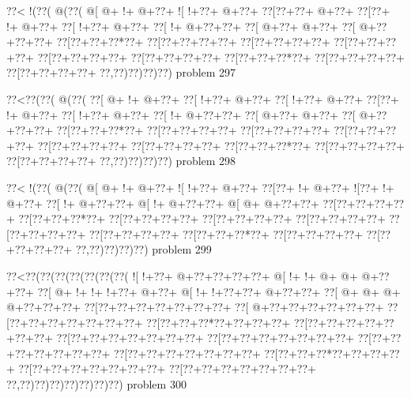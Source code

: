 \vbox{\vbox{\goo
\0??<\- !(\0??(\- @(\0??(
\- @[\- @+\- !+\- @+\0??+
\- ![\- !+\0??+\- @+\0??+
\0??[\0??+\0??+\- @+\0??+
\0??[\0??+\- !+\- @+\0??+
\0??[\- !+\0??+\- @+\0??+
\0??[\- !+\- @+\0??+\0??+
\0??[\- @+\0??+\- @+\0??+
\0??[\- @+\0??+\0??+\0??+
\0??[\0??+\0??+\0??*\0??+
\0??[\0??+\0??+\0??+\0??+
\0??[\0??+\0??+\0??+\0??+
\0??[\0??+\0??+\0??+\0??+
\0??[\0??+\0??+\0??+\0??+
\0??[\0??+\0??+\0??+\0??+
\0??[\0??+\0??+\0??*\0??+
\0??[\0??+\0??+\0??+\0??+
\0??[\0??+\0??+\0??+\0??+
\0??,\0??)\0??)\0??)\0??)
}
\hfil problem 297\hfil\break
}

\vbox{\vbox{\goo
\0??<\0??(\0??(\- @(\0??(
\0??[\- @+\- !+\- @+\0??+
\0??[\- !+\0??+\- @+\0??+
\0??[\- !+\0??+\- @+\0??+
\0??[\0??+\- !+\- @+\0??+
\0??[\- !+\0??+\- @+\0??+
\0??[\- !+\- @+\0??+\0??+
\0??[\- @+\0??+\- @+\0??+
\0??[\- @+\0??+\0??+\0??+
\0??[\0??+\0??+\0??*\0??+
\0??[\0??+\0??+\0??+\0??+
\0??[\0??+\0??+\0??+\0??+
\0??[\0??+\0??+\0??+\0??+
\0??[\0??+\0??+\0??+\0??+
\0??[\0??+\0??+\0??+\0??+
\0??[\0??+\0??+\0??*\0??+
\0??[\0??+\0??+\0??+\0??+
\0??[\0??+\0??+\0??+\0??+
\0??,\0??)\0??)\0??)\0??)
}
\hfil problem 298\hfil\break
}

\vbox{\vbox{\goo
\0??<\- !(\0??(\- @(\0??(
\- @[\- @+\- !+\- @+\0??+
\- ![\- !+\0??+\- @+\0??+
\0??[\0??+\- !+\- @+\0??+
\- ![\0??+\- !+\- @+\0??+
\0??[\- !+\- @+\0??+\0??+
\- @[\- !+\- @+\0??+\0??+
\- @[\- @+\- @+\0??+\0??+
\0??[\0??+\0??+\0??+\0??+
\0??[\0??+\0??+\0??*\0??+
\0??[\0??+\0??+\0??+\0??+
\0??[\0??+\0??+\0??+\0??+
\0??[\0??+\0??+\0??+\0??+
\0??[\0??+\0??+\0??+\0??+
\0??[\0??+\0??+\0??+\0??+
\0??[\0??+\0??+\0??*\0??+
\0??[\0??+\0??+\0??+\0??+
\0??[\0??+\0??+\0??+\0??+
\0??,\0??)\0??)\0??)\0??)
}
\hfil problem 299\hfil\break
}

\vbox{\vbox{\goo
\0??<\0??(\0??(\0??(\0??(\0??(\0??(\0??(
\- ![\- !+\0??+\- @+\0??+\0??+\0??+\0??+
\- @[\- !+\- !+\- @+\- @+\- @+\0??+\0??+
\0??[\- @+\- !+\- !+\- !+\0??+\- @+\0??+
\- @[\- !+\- !+\0??+\0??+\- @+\0??+\0??+
\0??[\- @+\- @+\- @+\- @+\0??+\0??+\0??+
\0??[\0??+\0??+\0??+\0??+\0??+\0??+\0??+
\0??[\- @+\0??+\0??+\0??+\0??+\0??+\0??+
\0??[\0??+\0??+\0??+\0??+\0??+\0??+\0??+
\0??[\0??+\0??+\0??*\0??+\0??+\0??+\0??+
\0??[\0??+\0??+\0??+\0??+\0??+\0??+\0??+
\0??[\0??+\0??+\0??+\0??+\0??+\0??+\0??+
\0??[\0??+\0??+\0??+\0??+\0??+\0??+\0??+
\0??[\0??+\0??+\0??+\0??+\0??+\0??+\0??+
\0??[\0??+\0??+\0??+\0??+\0??+\0??+\0??+
\0??[\0??+\0??+\0??*\0??+\0??+\0??+\0??+
\0??[\0??+\0??+\0??+\0??+\0??+\0??+\0??+
\0??[\0??+\0??+\0??+\0??+\0??+\0??+\0??+
\0??,\0??)\0??)\0??)\0??)\0??)\0??)\0??)
}
\hfil problem 300\hfil\break
}


